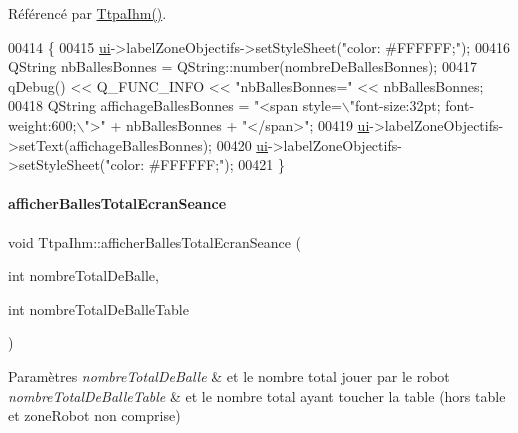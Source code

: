 Référencé par \hyperlink{class_ttpa_ihm_ab3ed4b37a93ff04842414d4a98861d66}{Ttpa\+Ihm()}.


\begin{DoxyCode}
00414 \{
00415     \hyperlink{class_ttpa_ihm_ad5fae1222a667da158c26f3d0f0dce23}{ui}->labelZoneObjectifs->setStyleSheet(\textcolor{stringliteral}{"color: #FFFFFF;"});
00416     QString nbBallesBonnes = QString::number(nombreDeBallesBonnes);
00417     qDebug() << Q\_FUNC\_INFO << \textcolor{stringliteral}{"nbBallesBonnes="} << nbBallesBonnes;
00418     QString affichageBallesBonnes = \textcolor{stringliteral}{"<span style=\(\backslash\)"font-size:32pt; font-weight:600;\(\backslash\)">"} + nbBallesBonnes + \textcolor{stringliteral}{
      "</span>"};
00419     \hyperlink{class_ttpa_ihm_ad5fae1222a667da158c26f3d0f0dce23}{ui}->labelZoneObjectifs->setText(affichageBallesBonnes);
00420     \hyperlink{class_ttpa_ihm_ad5fae1222a667da158c26f3d0f0dce23}{ui}->labelZoneObjectifs->setStyleSheet(\textcolor{stringliteral}{"color: #FFFFFF;"});
00421 \}
\end{DoxyCode}
\mbox{\label{class_ttpa_ihm_a7b8784d0550cf910b89006365bc8383a}} 
\paragraph{\texorpdfstring{afficher\+Balles\+Total\+Ecran\+Seance}{afficherBallesTotalEcranSeance}}
{\footnotesize\ttfamily void Ttpa\+Ihm\+::afficher\+Balles\+Total\+Ecran\+Seance (\begin{DoxyParamCaption}\item[{int}]{nombre\+Total\+De\+Balle,  }\item[{int}]{nombre\+Total\+De\+Balle\+Table }\end{DoxyParamCaption})\hspace{0.3cm}{\ttfamily [slot]}}


\begin{DoxyParams}{Paramètres}
{\em nombre\+Total\+De\+Balle} & et le nombre total jouer par le robot \\
\hline
{\em nombre\+Total\+De\+Balle\+Table} & et le nombre total ayant toucher la table (hors table et zone\+Robot non comprise) \\
\hline
\end{DoxyParams}


